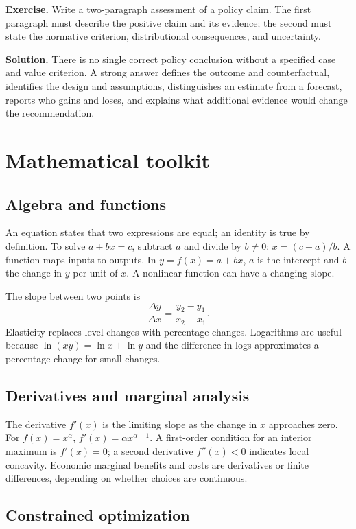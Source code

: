\documentclass[11pt,oneside,openany]{book}
\newcommand{\exercise}[1]{\textbf{Exercise.} #1}
\newcommand{\solution}[1]{\textbf{Solution.} #1}
\begin{document}
\exercise{Write a two-paragraph assessment of a policy claim. The first paragraph must describe the positive claim and its evidence; the second must state the normative criterion, distributional consequences, and uncertainty.}

\solution{There is no single correct policy conclusion without a specified case and value criterion. A strong answer defines the outcome and counterfactual, identifies the design and assumptions, distinguishes an estimate from a forecast, reports who gains and loses, and explains what additional evidence would change the recommendation.}

\appendix

\chapter{Mathematical toolkit}
\label{app:math}

\section{Algebra and functions}

An equation states that two expressions are equal; an identity is true by definition. To solve $a+bx=c$, subtract $a$ and divide by $b\neq0$: $x=(c-a)/b$. A function maps inputs to outputs. In $y=f(x)=a+bx$, $a$ is the intercept and $b$ the change in $y$ per unit of $x$. A nonlinear function can have a changing slope.

The slope between two points is
\[
  \frac{\Delta y}{\Delta x}=\frac{y_2-y_1}{x_2-x_1}.
\]
Elasticity replaces level changes with percentage changes. Logarithms are useful because $\ln(xy)=\ln x+\ln y$ and the difference in logs approximates a percentage change for small changes.

\section{Derivatives and marginal analysis}

The derivative $f'(x)$ is the limiting slope as the change in $x$ approaches zero. For $f(x)=x^\alpha$, $f'(x)=\alpha x^{\alpha-1}$. A first-order condition for an interior maximum is $f'(x)=0$; a second derivative $f''(x)<0$ indicates local concavity. Economic marginal benefits and costs are derivatives or finite differences, depending on whether choices are continuous.

\section{Constrained optimization}
\end{document}
